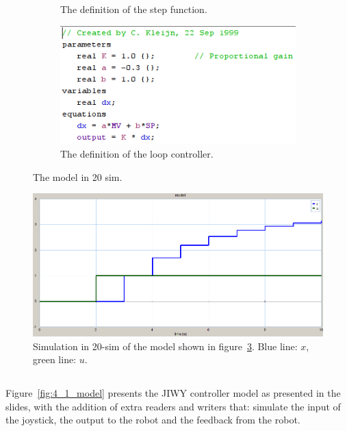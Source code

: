 \documentclass[a4paper,twoside,11pt]{article}
\begin{document}
\begin{figure}
\begin{subfigure}{0.5\textwidth}
	 \caption{The definition of the step function.}
	 \label{fig:3_1-20sim-model:step}
	\end{subfigure}%
	\begin{subfigure}{0.5\textwidth}
	 \centering
	 \includegraphics[width=\textwidth]{./images/3_1-20sim-model-controller.png}
	 \caption{The definition of the loop controller.}
	 \label{fig:3_1-20sim-model:cont}
	\end{subfigure}
	\caption{The model in 20 sim.}
	\label{fig:3_1-20sim-model}
\end{figure}

\begin{figure}
	\centering
	\includegraphics[width=\textwidth]{./images/3_1-simulation.png}
	\caption{Simulation in 20-sim of the model shown in figure~\ref{fig:3_1-20sim-model}. Blue line: $x$, green line: $u$.}
	\label{fig:3_1-simulation}
\end{figure}

\FloatBarrier
\subsection{}
\subsubsection{}
Figure~\ref{fig:4_1_model} presents the JIWY controller model as presented in 
the slides, with the addition of extra readers and writers that: simulate the 
input of the joystick, the output to the robot and the feedback from the robot.
\end{document}
